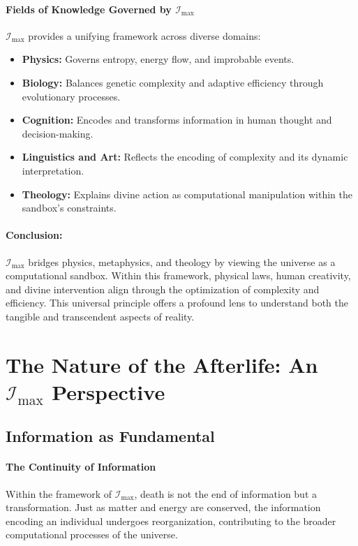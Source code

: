 \documentclass[12pt]{article}
\begin{document}
\paragraph{Fields of Knowledge Governed by \(\mathcal{I}_{\text{max}}\)}
\(\mathcal{I}_{\text{max}}\) provides a unifying framework across diverse domains:
\begin{itemize}
    \item \textbf{Physics:} Governs entropy, energy flow, and improbable events.
    \item \textbf{Biology:} Balances genetic complexity and adaptive efficiency through evolutionary processes.
    \item \textbf{Cognition:} Encodes and transforms information in human thought and decision-making.
    \item \textbf{Linguistics and Art:} Reflects the encoding of complexity and its dynamic interpretation.
    \item \textbf{Theology:} Explains divine action as computational manipulation within the sandbox's constraints.
\end{itemize}

\paragraph{Conclusion:}
\(\mathcal{I}_{\text{max}}\) bridges physics, metaphysics, and theology by viewing the universe as a computational sandbox. Within this framework, physical laws, human creativity, and divine intervention align through the optimization of complexity and efficiency. This universal principle offers a profound lens to understand both the tangible and transcendent aspects of reality.

\section{The Nature of the Afterlife: An \(\mathcal{I}_{\text{max}}\) Perspective}

\subsection{Information as Fundamental}
\paragraph{The Continuity of Information}
Within the framework of \(\mathcal{I}_{\text{max}}\), death is not the end of information but a transformation. Just as matter and energy are conserved, the information encoding an individual undergoes reorganization, contributing to the broader computational processes of the universe.
\end{document}
